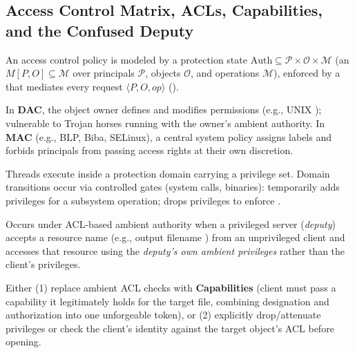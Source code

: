\subsection{Access Control Matrix, ACLs, Capabilities, and the Confused Deputy}
An access control policy is modeled by a protection state $\mathrm{Auth} \subseteq \mathcal{P} \times \mathcal{O} \times \mathcal{M}$ (an  $M[P, O] \subseteq \mathcal{M}$ over principals $\mathcal{P}$, objects $\mathcal{O}$, and operations $\mathcal{M}$), enforced by a  that mediates every request $\langle P, O, op \rangle$ ().
\begin{compactitem}
  \item {} In \textbf{DAC}, the object owner defines and modifies permissions (e.g., UNIX ); vulnerable to Trojan horses running with the owner's ambient authority. In \textbf{MAC} (e.g., BLP, Biba, SELinux), a central system policy assigns labels and forbids principals from passing access rights at their own discretion.
  \item {} Threads execute inside a protection domain carrying a privilege set. Domain transitions occur via controlled gates (system calls,  binaries):  temporarily adds privileges for a subsystem operation;  drops privileges to enforce .
  \item {} Occurs under ACL-based ambient authority when a privileged server (\emph{deputy}) accepts a resource name (e.g., output filename ) from an unprivileged client and accesses that resource using the \emph{deputy's own ambient privileges} rather than the client's privileges.
  \item {} Either (1) replace ambient ACL checks with \textbf{Capabilities} (client must pass a capability it legitimately holds for the target file, combining designation and authorization into one unforgeable token), or (2) explicitly drop/attenuate privileges or check the client's identity against the target object's ACL before opening.
\end{compactitem}

